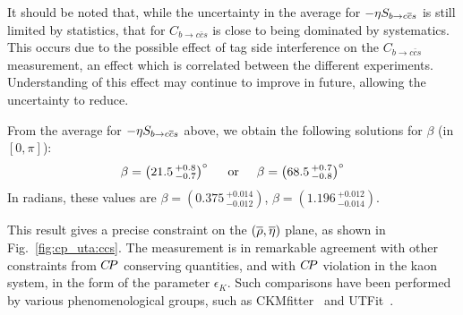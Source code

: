 



It should be noted that, while the uncertainty in the average for 
$-\etacp S_{b \to c\bar c s}$ is still limited by statistics,
that for $C_{b \to c\bar c s}$ is close to being dominated by systematics.
This occurs due to the possible effect of tag side interference on the
$C_{b \to c\bar c s}$ measurement, an effect which is correlated between
the different experiments.
Understanding of this effect may continue to improve in future,
allowing the uncertainty to reduce.

From the average for $-\etacp S_{b \to c\bar c s}$ above, 
we obtain the following solutions for $\beta$
(in $\left[ 0, \pi \right]$):
\begin{equation}
  \beta = \left( 21.5 \,^{+0.8}_{-0.7} \right)^\circ
  \hspace{5mm}
  {\rm or}
  \hspace{5mm}
  \beta = \left( 68.5 \,^{+0.7}_{-0.8} \right)^\circ
  \label{eq:cp_uta:sin2beta}
\end{equation}
In radians, these values are 
$\beta = \left( 0.375 \, ^{+0.014}_{-0.012} \right)$, 
$\beta = \left( 1.196 \, ^{+0.012}_{-0.014} \right)$.

This result gives a precise constraint on the $(\overline{\rho},\overline{\eta})$ plane,
as shown in Fig.~\ref{fig:cp_uta:ccs}.
The measurement is in remarkable agreement with other constraints from 
$C\!P$ conserving quantities, 
and with $C\!P$ violation in the kaon system, in the form of the parameter $\epsilon_K$.
Such comparisons have been performed by various phenomenological groups,
such as CKMfitter~\cite{Charles:2004jd} 
and UTFit~\cite{Bona:2005vz}.

